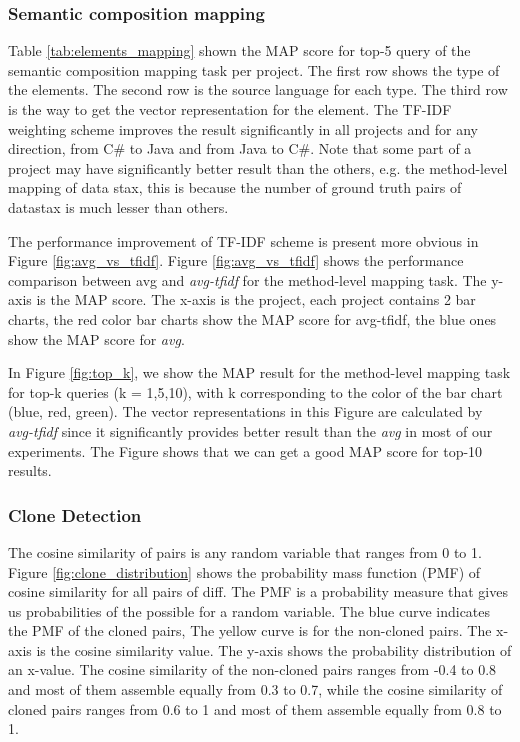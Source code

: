\subsubsection{Semantic composition mapping}


Table \ref{tab:elements_mapping} shown the MAP score for top-5 query of the semantic composition mapping task per project. The first row shows the type of the elements. The second row is the source language for each type. The third row is the way to get the vector representation for the element. The TF-IDF weighting scheme improves the result significantly in all projects and for any direction, from C\# to Java and from Java to C\#. Note that some part of a project may have significantly better result than the others, e.g. the method-level mapping of data stax, this is because the number of ground truth pairs of datastax is much lesser than others.

The performance improvement of TF-IDF scheme is present more obvious in Figure \ref{fig:avg_vs_tfidf}. Figure \ref{fig:avg_vs_tfidf} shows the performance comparison between avg and \textit{avg-tfidf} for the method-level mapping task. The y-axis is the MAP score. The x-axis is the project, each project contains 2 bar charts, the red color bar charts show the MAP score for avg-tfidf, the blue ones show the MAP score for \textit{avg}. 

In Figure \ref{fig:top_k}, we show the MAP result for the method-level mapping task for top-k queries (k = 1,5,10), with k corresponding to the color of the bar chart (blue, red, green). The vector representations in this Figure are calculated by \textit{avg-tfidf} since it significantly provides better result than the \textit{avg} in most of our experiments. The Figure shows that we can get a good MAP score for top-10 results. 

\subsubsection{Clone Detection}
The cosine similarity of pairs is any random variable that ranges from 0 to 1. Figure \ref{fig:clone_distribution} shows the probability mass function (PMF) of cosine similarity for all pairs of diff. The PMF is a probability measure that gives us probabilities of the possible for a random variable. The blue curve indicates the PMF of the cloned pairs, The yellow curve is for the non-cloned pairs. The x-axis is the cosine similarity value. The y-axis shows the probability distribution of an x-value. The cosine similarity of the non-cloned pairs ranges from -0.4 to 0.8 and most of them assemble equally from 0.3 to 0.7, while the cosine similarity of cloned pairs ranges from 0.6 to 1 and most of them assemble equally from 0.8 to 1.

